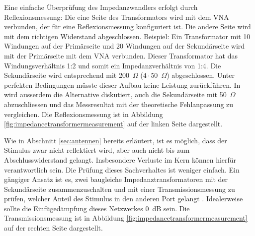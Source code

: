 \documentclass[twoside,a4paper,11pt,halfparskip,DIV=11,notitlepage]{scrartcl}
\newcommand{\Ohm}{$\Omega$\xspace}
\begin{document}
Eine einfache Überprüfung des Impedanzwandlers erfolgt durch Reflexionsmessung: Die eine Seite
des Transformators wird mit dem VNA verbunden, der für eine Reflexionsmessung konfiguriert ist.
Die andere Seite wird mit dem richtigen Widerstand abgeschlossen. Beispiel: Ein Transformator
mit 10 Windungen auf der Primärseite und 20 Windungen auf der Sekundärseite
wird mit der Primärseite mit dem VNA verbunden. Dieser Transformator hat das Windungsverhältnis
1:2 und somit ein Impedanzverhältnis von 1:4. Die Sekundärseite wird entsprechend mit 200~\Ohm
($4\cdot 50$~\Ohm) abgeschlossen. Unter perfekten Bedingungen müsste dieser Aufbau keine
Leistung zurückführen. In \cite{ferreira2019evaluating} wird ausserdem die Alternative diskutiert,
auch die Sekundärseite mit 50~\Ohm abzuschliessen und das Messresultat mit der theoretische
Fehlanpassung zu vergleichen. Die Reflexionsmessung ist in Abbildung \ref{fig:impedancetransformermeasurement}
auf der linken Seite dargestellt.

Wie in Abschnitt \ref{sec:antennen} bereits erläutert, ist es möglich, dass der Stimulus zwar
nicht reflektiert wird, aber auch nicht bis zum Abschlusswiderstand gelangt. Insbesondere
Verluste im Kern können hierfür verantwortlich sein. Die Prüfung dieses Sachverhaltes ist
weniger einfach. Ein gängiger Ansatz ist es, zwei baugleiche Impedanztransformatoren mit
der Sekundärseite zusammenzuschalten und mit einer Transmissionsmessung zu prüfen, welcher
Anteil des Stimulus in den anderen Port gelangt \cite{ferreira2019evaluating}.
Idealerweise sollte die Einfügedämpfung dieses Netzwerkes 0~dB sein. Die Transmissionsmessung
ist in Abbildung \ref{fig:impedancetransformermeasurement} auf der rechten Seite dargestellt.
\end{document}
